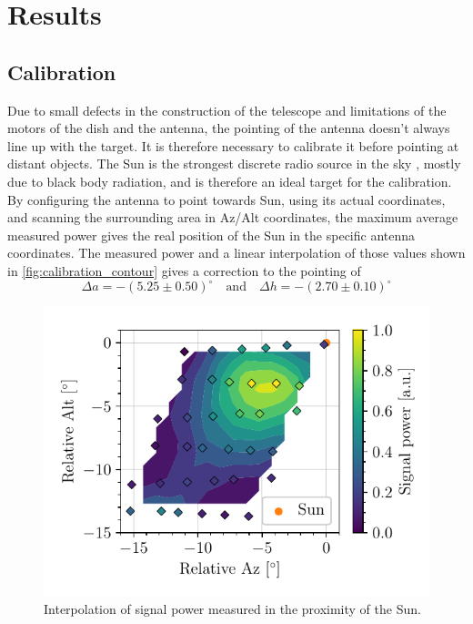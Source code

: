 \section{Results}
\subsection{Calibration}

Due to small defects in the construction of the telescope and limitations of the motors of the dish and the antenna, the pointing of the antenna doesn't always line up with the target. It is therefore necessary to calibrate it before pointing at distant objects. The Sun is the strongest discrete radio source in the sky \cite{burke_introduction_2013}, mostly due to black body radiation, and is therefore an ideal target for the calibration.
By configuring the antenna to point towards Sun, using its actual coordinates, and scanning the surrounding area in Az/Alt coordinates, the maximum average measured power gives the real position of the Sun in the specific antenna coordinates. The measured power and a linear interpolation of those values shown in \autoref{fig:calibration_contour} gives a correction to the pointing of
\begin{equation} \label{eq:offset}
    \Delta a = -(5.25 \pm 0.50)^\circ \quad \textrm{and} \quad \Delta h = -(2.70 \pm 0.10)^\circ
\end{equation}
\begin{figure}[htbp]
    \centering
    \includegraphics[scale=1]{figures/calibration_contour.pdf}
    \caption{Interpolation of signal power measured in the proximity of the Sun.}
    \label{fig:calibration_contour}
\end{figure}

